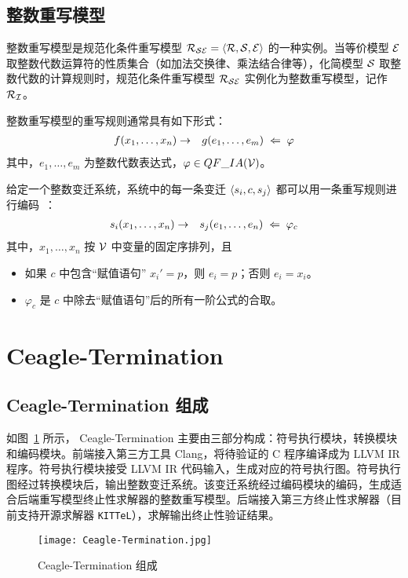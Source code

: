 \subsection{整数重写模型}
整数重写模型是规范化条件重写模型 $\mathcal{R}_{\mathcal{S}\mathcal{E}} = \langle \mathcal{R},\mathcal{S},\mathcal{E} \rangle$ 的一种实例。当等价模型 $\mathcal{E}$ 取整数代数运算符的性质集合（如加法交换律、乘法结合律等），化简模型 $\mathcal{S}$ 取整数代数的计算规则时，规范化条件重写模型 $\mathcal{R}_{\mathcal{S}\mathcal{E}}$ 实例化为整数重写模型，记作 $\mathcal{R}_{\mathcal{I}}$。

整数重写模型的重写规则通常具有如下形式：
\begin{eqnarray}
f(x_1,\ldots,x_n) & \rightarrow & g(e_1,\ldots,e_m) \;\Leftarrow\; \varphi \nonumber
\end{eqnarray}
其中，$e_1,\ldots,e_m$ 为整数代数表达式，$\varphi\in QF\_IA(\mathcal{V})$。

给定一个整数变迁系统，系统中的每一条变迁 $\langle s_i, c, s_j \rangle$ 都可以用一条重写规则进行编码~\cite{DBLP:conf/cade/FalkeK09,DBLP:conf/rta/FalkeKS11}：
\begin{eqnarray}
s_i(x_1,\ldots,x_n) & \rightarrow & s_j(e_1,\dots,e_n) \;\Leftarrow\; \varphi_c \nonumber
\end{eqnarray}
其中，$x_1,\ldots,x_n$ 按 $\mathcal{V}$ 中变量的固定序排列，且
\begin{itemize}
\item 如果 $c$ 中包含“赋值语句” $x_i' = p$，则 $e_i = p$；否则 $e_i = x_i$。
\item $\varphi_c$ 是 $c$ 中除去“赋值语句”后的所有一阶公式的合取。
\end{itemize}

\section{Ceagle-Termination}

\subsection{Ceagle-Termination 组成}

如图~\ref{f:Ceagle-Termination} 所示， Ceagle-Termination 主要由三部分构成：符号执行模块，转换模块和编码模块。前端接入第三方工具 Clang，将待验证的 C 程序编译成为 LLVM IR 程序。符号执行模块接受 LLVM IR 代码输入，生成对应的符号执行图。符号执行图经过转换模块后，输出整数变迁系统。该变迁系统经过编码模块的编码，生成适合后端重写模型终止性求解器的整数重写模型。后端接入第三方终止性求解器（目前支持开源求解器 \verb|KITTeL|），求解输出终止性验证结果。

\begin{figure}[ht]
\centering
\texttt{[image: Ceagle-Termination.jpg]}
\caption{Ceagle-Termination 组成}
\label{f:Ceagle-Termination}
\end{figure}

